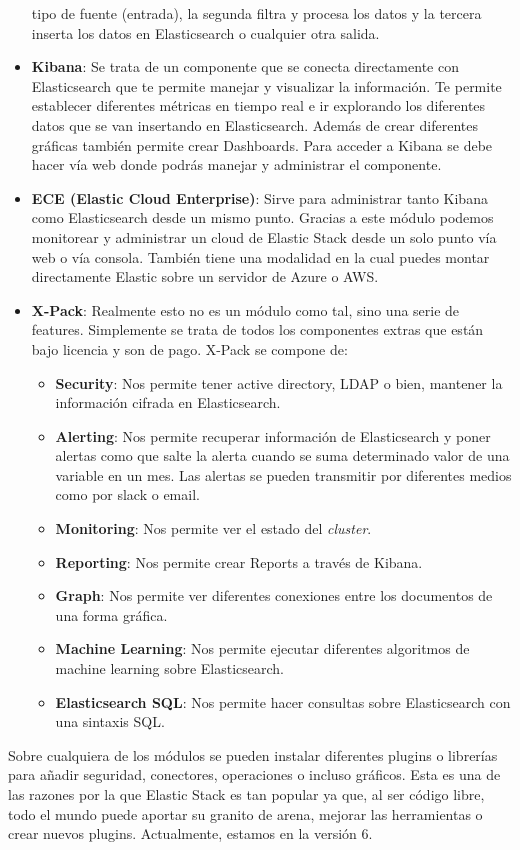 \begin{itemize}
  tipo de fuente (entrada), la segunda filtra y procesa los datos y la
  tercera inserta los datos en Elasticsearch o cualquier otra salida.
\item \textbf{Kibana}: Se trata de un componente que se conecta
  directamente con Elasticsearch que te permite manejar y visualizar la
  información. Te permite establecer diferentes métricas en tiempo real e
  ir explorando los diferentes datos que se van insertando en
  Elasticsearch. Además de crear diferentes gráficas también permite crear
  Dashboards. Para acceder a Kibana se debe hacer vía web donde podrás
  manejar y administrar el componente.
\item \textbf{ECE (Elastic Cloud Enterprise)}: Sirve para administrar tanto
  Kibana como Elasticsearch desde un mismo punto. Gracias a este módulo
  podemos monitorear y administrar un cloud de Elastic Stack desde un solo
  punto vía web o vía consola. También tiene una modalidad en la cual
  puedes montar directamente Elastic sobre un servidor de Azure o AWS.
\item \textbf{X-Pack}: Realmente esto no es un módulo como tal, sino una
  serie de features. Simplemente se trata de todos los componentes extras
  que están bajo licencia y son de pago. X-Pack se compone de:
\begin{itemize}
\item \textbf{Security}: Nos permite tener active directory, LDAP o bien,
  mantener la información cifrada en Elasticsearch.
\item \textbf{Alerting}: Nos permite recuperar información de Elasticsearch
  y poner alertas como que salte la alerta cuando se suma determinado valor
  de una variable en un mes. Las alertas se pueden transmitir por
  diferentes medios como por slack o email.
\item \textbf{Monitoring}: Nos permite ver el estado del \emph{cluster}.
\item \textbf{Reporting}: Nos permite crear Reports a través de Kibana.
\item \textbf{Graph}: Nos permite ver diferentes conexiones entre los
  documentos de una forma gráfica.
\item \textbf{Machine Learning}: Nos permite ejecutar diferentes algoritmos
  de machine learning sobre Elasticsearch.
\item\textbf{ Elasticsearch SQL}: Nos permite hacer consultas sobre
  Elasticsearch con una sintaxis SQL.
\end{itemize}
\end{itemize}

Sobre cualquiera de los módulos se pueden instalar diferentes plugins o
librerías para añadir seguridad, conectores, operaciones o incluso
gráficos. Esta es una de las razones por la que Elastic Stack es tan
popular ya que, al ser código libre, todo el mundo puede aportar su granito
de arena, mejorar las herramientas o crear nuevos plugins. Actualmente,
estamos en la versión 6.


